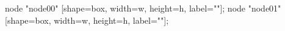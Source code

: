 node "node00" [shape=box, width=w, height=h, label=""];
node "node01" [shape=box, width=w, height=h, label=""];